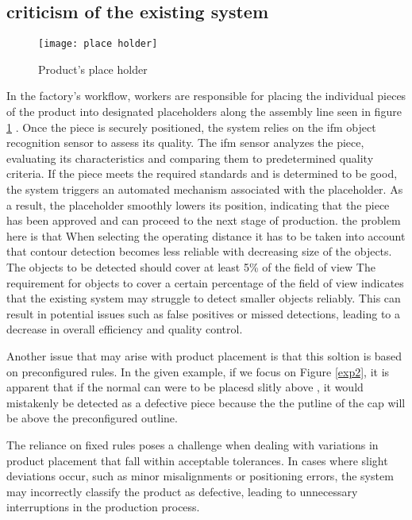 \subsection{criticism of the existing system}
\FloatBarrier
\begin{figure}[h]

         \centering
        \texttt{[image: place holder]}
   
        \caption{Product's place holder}
        \label{fig:place holder}
\FloatBarrier
    \end{figure}

\FloatBarrier


In the factory's workflow, workers are responsible for placing the individual pieces of the product into designated placeholders along the assembly line seen in figure \ref{fig:place holder} . Once the piece is securely positioned, the system relies on the ifm object recognition sensor to assess its quality.
The ifm sensor analyzes the piece, evaluating its characteristics and comparing them to predetermined quality criteria. If the piece meets the required standards and is determined to be good, the system triggers an automated mechanism associated with the placeholder. As a result, the placeholder smoothly lowers its position, indicating that the piece has been approved and can proceed to the next stage of production. the problem here is that When selecting the operating distance it has to be taken into account that contour detection becomes less reliable with decreasing size of the objects. The objects to
be detected should cover at least 5\% of the field of view
The requirement for objects to cover a certain percentage of the field of view indicates that the existing system may struggle to detect smaller objects reliably. This can result in potential issues such as false positives or missed detections, leading to a decrease in overall efficiency and quality control.

Another issue that may arise with product placement is that this soltion is based on preconfigured rules. In the given example, if we focus on Figure \ref{exp2}, it is apparent that if the normal can were to be placesd slitly above  , it would mistakenly be detected as a defective piece because the the putline of the cap will be above the preconfigured outline.

The reliance on fixed rules poses a challenge when dealing with variations in product placement that fall within acceptable tolerances. In cases where slight deviations occur, such as minor misalignments or positioning errors, the system may incorrectly classify the product as defective, leading to unnecessary interruptions in the production process.

